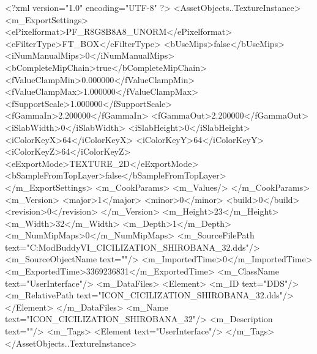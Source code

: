 <?xml version="1.0" encoding="UTF-8" ?>
<AssetObjects..TextureInstance>
	<m_ExportSettings>
		<ePixelformat>PF_R8G8B8A8_UNORM</ePixelformat>
		<eFilterType>FT_BOX</eFilterType>
		<bUseMips>false</bUseMips>
		<iNumManualMips>0</iNumManualMips>
		<bCompleteMipChain>true</bCompleteMipChain>
		<fValueClampMin>0.000000</fValueClampMin>
		<fValueClampMax>1.000000</fValueClampMax>
		<fSupportScale>1.000000</fSupportScale>
		<fGammaIn>2.200000</fGammaIn>
		<fGammaOut>2.200000</fGammaOut>
		<iSlabWidth>0</iSlabWidth>
		<iSlabHeight>0</iSlabHeight>
		<iColorKeyX>64</iColorKeyX>
		<iColorKeyY>64</iColorKeyY>
		<iColorKeyZ>64</iColorKeyZ>
		<eExportMode>TEXTURE_2D</eExportMode>
		<bSampleFromTopLayer>false</bSampleFromTopLayer>
	</m_ExportSettings>
	<m_CookParams>
		<m_Values/>
	</m_CookParams>
	<m_Version>
		<major>1</major>
		<minor>0</minor>
		<build>0</build>
		<revision>0</revision>
	</m_Version>
	<m_Height>23</m_Height>
	<m_Width>32</m_Width>
	<m_Depth>1</m_Depth>
	<m_NumMipMaps>0</m_NumMipMaps>
	<m_SourceFilePath text="C:\Users\asus\Documents\Firaxis ModBuddy\Civilization VI\temppic\ICON_CICILIZATION_SHIROBANA_32.dds"/>
	<m_SourceObjectName text=""/>
	<m_ImportedTime>0</m_ImportedTime>
	<m_ExportedTime>3369236831</m_ExportedTime>
	<m_ClassName text="UserInterface"/>
	<m_DataFiles>
		<Element>
			<m_ID text="DDS"/>
			<m_RelativePath text="ICON_CICILIZATION_SHIROBANA_32.dds"/>
		</Element>
	</m_DataFiles>
	<m_Name text="ICON_CICILIZATION_SHIROBANA_32"/>
	<m_Description text=""/>
	<m_Tags>
		<Element text="UserInterface"/>
	</m_Tags>
</AssetObjects..TextureInstance>

